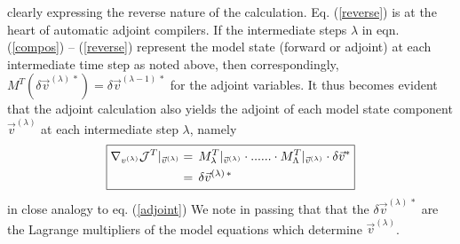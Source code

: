 %
clearly expressing the reverse nature of the calculation.
Eq. (\ref{reverse}) is at the heart of automatic adjoint compilers.
If the intermediate steps $\lambda$ in 
eqn. (\ref{compos}) -- (\ref{reverse})
represent the model state (forward or adjoint) at each 
intermediate time step as noted above, then correspondingly,
$ M^T (\delta \vec{v}^{(\lambda) \, \ast}) = 
\delta \vec{v}^{(\lambda-1) \, \ast} $ for the adjoint variables.
It thus becomes evident that the adjoint calculation also
yields the adjoint of each model state component 
$ \vec{v}^{(\lambda)} $ at each intermediate step $ \lambda $, namely
%
\begin{equation}
\boxed{
\begin{split}
\nabla_{v^{(\lambda)}} {\cal J}^T |_{\vec{v}^{(\lambda)}}
& = \,
M_{\lambda}^T |_{\vec{v}^{(\lambda)}} \cdot ...... \cdot 
M_{\Lambda}^T |_{\vec{v}^{(\lambda)}} \cdot \delta \vec{v}^{\ast} \\
~ & = \, \delta \vec{v}^{(\lambda) \, \ast}
\end{split}
}
\end{equation}
%
in close analogy to eq. (\ref{adjoint})
We note in passing that that the $\delta \vec{v}^{(\lambda) \, \ast}$
are the Lagrange multipliers of the model equations which determine
$ \vec{v}^{(\lambda)}$.

